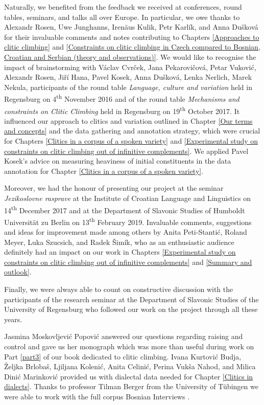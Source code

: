 Naturally, we benefited from the feedback we received at conferences, round tables, seminars, and talks all over Europe. In particular, we owe thanks to Alexandr Rosen, Uwe Junghanns, Irenäus Kulik, Petr Karlík, and Anna Dušková for their invaluable comments and notes contributing to Chapters \ref{Approaches to clitic climbing} and \ref{Constraints on clitic climbing in Czech compared to Bosnian, Croatian and Serbian (theory and observations)}. We would like to recognise the impact of brainstorming with Václav Cvrček, Jana Pekarovičová, Petar Vuković, Alexandr Rosen, Jiří Hana, Pavel Kosek, Anna Dušková, Lenka Nerlich, Marek Nekula, participants of the round table \textit{Language, culture and variation} held in Regensburg on 4\textsuperscript{th} November 2016 and of the round table \textit{Mechanisms and constraints on Clitic Climbing} held in Regensburg on 19\textsuperscript{th} October 2017. It influenced our approach to clitics and variation outlined in Chapter \ref{Our terms and concepts} and the data gathering and annotation strategy, which were crucial for Chapters \ref{Clitics in a corpus of a spoken variety} and \ref{Experimental study on constraints on clitic climbing out of infinitive complements}. We applied Pavel Kosek’s advice on measuring heaviness of initial constituents in the data annotation for Chapter \ref{Clitics in a corpus of a spoken variety}. 
    
Moreover, we had the honour of presenting our project at the seminar \textit{Jezikoslovne rasprave} at the Institute of Croatian Language and Linguistics on 14\textsuperscript{th} December 2017 and at the Department of Slavonic Studies of Humboldt Universität zu Berlin on 13\textsuperscript{th} February 2019. Invaluable comments, suggestions and ideas for improvement made among others by Anita Peti-Stantić, Roland Meyer, Luka Szucsich, and Radek Šimík, who as an enthusiastic audience definitely had an impact on our work in Chapters \ref{Experimental study on constraints on clitic climbing out of infinitive complements} and \ref{Summary and outlook}. 

Finally, we were always able to count on constructive discussion with the participants of the research seminar at the Department of Slavonic Studies of the University of Regensburg who followed our work on the project through all these years. 

Jasmina Moskovljević Popović answered our questions regarding raising and control and gave us her monograph  which was more than useful during work on Part \ref{part3} of our book dedicated to clitic climbing. Ivana Kurtović Budja, Željka Brlobaš, Ljiljana Kolenić, Anita Celinić, Perina Vukša Nahod, and Milica Dinić Marinković provided us with dialectal data needed for Chapter \ref{Clitics in dialects}. Thanks to professor Tilman Berger from the University of Tübingen we were able to work with the full corpus Bosnian Interviews \citep{RaeckeStevanovic01}.

